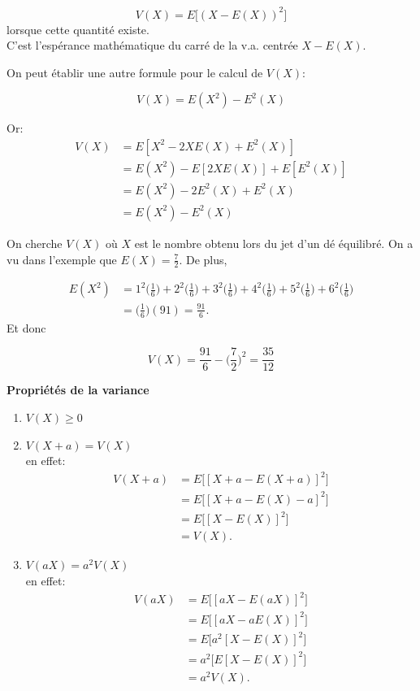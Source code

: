 \documentclass[]{book}
\theoremstyle{magentacolor}
\theoremstyle{proprie}
\theoremstyle{exstyle}
\theoremstyle{exostyle}
\theoremstyle{definition}
\theoremstyle{definition}
\theoremstyle{definition}
\theoremstyle{remark}
\begin{document}
\[V(X)=E\big[ (X-E(X))^2 \big]\] lorsque cette quantité existe.\\
C'est l'espérance mathématique du carré de la v.a. centrée \(X-E(X)\).

On peut établir une autre formule pour le calcul de \(V(X)\):

\[V(X)=E(X^2)-E^2(X)\]

Or: \[\begin{aligned}
      V(X)&= E\left[X^2-2XE(X)+E^2(X)\right] \\
           &=E(X^2)-E[2XE(X)]+ E[E^2(X)]\\
           &=E(X^2)-2E^2(X)+E^2(X) \\ 
           &=E(X^2)-E^2(X)
    \end{aligned}\]

On cherche \(V(X)\) où \(X\) est le nombre obtenu lors du jet d'un dé
équilibré. On a vu dans l'exemple
que \(E(X) = \frac{7}{2}\). De plus,

\[\begin{aligned}
  E(X^2) &= 1^2 \bigg(\frac{1}{6}\bigg) + 2^2 \bigg(\frac{1}{6}\bigg) + 3^2 \bigg(\frac{1}{6}\bigg) + 4^2 \bigg(\frac{1}{6}\bigg) + 5^2 \bigg(\frac{1}{6}\bigg) + 6^2 \bigg(\frac{1}{6}\bigg) \\
        &=\bigg(\frac{1}{6}\bigg) (91) = \frac{91}{6}.\end{aligned}\] Et
donc

\[V(X) = \frac{91}{6} - \bigg(\frac{7}{2}\bigg)^2 = \frac{35}{12}\]

\textbf{Propriétés de la variance}

\begin{enumerate}
\def\labelenumi{\arabic{enumi}.}
\item
  \(V(X) \geq 0\)
\item
  \(V(X+a)=V(X)\)\\
  en effet: \[\begin{aligned}
     V(X+a)   &= E\big[\left[X+a-E(X+a)\right]^2\big] \\ 
          &=E\big[\left[X+a-E(X)-a\right]^2\big] \\ 
          &=E\big[\left[X-E(X)\right]^2\big] \\
          &=V(X). 
     \end{aligned}\]
\item
  \(V(aX)=a^2V(X)\)\\
  en effet: \[\begin{aligned}
     V(aX)  &= E\big[\left[aX-E(aX)\right]^2\big] \\
        &=E\big[\left[aX-aE(X)\right]^2\big] \\ 
        &=E\big[a^2\left[X-E(X)\right]^2\big] \\
        &=a^2\big[E\left[X-E(X)\right]^2\big] \\
        &= a^2V(X). 
     \end{aligned}\]
\end{enumerate}
\end{document}
